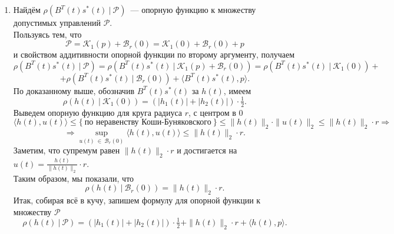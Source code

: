 \documentclass[a4paper,11pt]{article}
\begin{document}
\begin{enumerate}
\item Найдём $ \rho{(B^{T}(t)s^{*}(t) \ | \ \mathcal{P})} $~--- опорную функцию к множеству допустимых управлений $\mathcal{P}$. \\
Пользуясь тем, что \[\mathcal{P} = \mathcal{K}_1(p) + \mathcal{B}_r(0) = \mathcal{K}_1(0) + \mathcal{B}_r(0) + p \]
и свойством аддитивности опорной функции по второму аргументу, получаем
\[ \rho{(B^{T}(t)s^{*}(t) \ | \ \mathcal{P})} = \rho{(B^{T}(t)s^{*}(t) \ | \ \mathcal{K}_1(p) + \mathcal{B}_r(0))} = \rho{(B^{T}(t)s^{*}(t) \ | \ \mathcal{K}_1(0))} + \] 
\[ + \rho{(B^{T}(t)s^{*}(t) \ | \ \mathcal{B}_r(0))} + \langle B^{T}(t)s^{*}(t), p \rangle. \]
По доказанному выше, обозначив $B^{T}(t)s^{*}(t)$ за $h(t)$, имеем 
\[ \rho{(h(t)\ | \ \mathcal{K}_1(0))} = (|h_1(t)| + |h_2(t)|) \cdot \tfrac{1}{2}. \]
Выведем опорную функцию для круга радиуса $r$, с центром в 0
\[ \langle h(t), u(t) \rangle \leqslant \{\  \text{по неравенству Коши-Буняковского} \ \} \leqslant \|h(t)\|_2 \cdot \|u(t)\|_2 \leqslant \|h(t)\|_2 \cdot r \Rightarrow \]
\[ \Rightarrow \sup\limits_{u(t) \ \in \ \mathcal{B}_r(0)}{\langle h(t), u(t) \rangle} \leqslant \|h(t)\|_2 \cdot r. \]
Заметим, что супремум равен $\|h(t)\|_2 \cdot r$ и достигается на $u(t) = \frac{h(t)}{\| h(t) \|_2} \cdot r.$ \\
Таким образом, мы показали, что
\[ \rho{(h(t) \ | \ \mathcal{B}_r(0))} = \|h(t)\|_2 \cdot r.\]
Итак, собирая всё в кучу, запишем формулу для опорной функции к множеству $\mathcal{P}$
\[ \rho{(h(t) \ | \ \mathcal{P})} = (|h_1(t)| + |h_2(t)|) \cdot \tfrac{1}{2} + \|h(t)\|_2 \cdot r + \langle h(t), p \rangle. \]


\end{enumerate}
\end{document}
